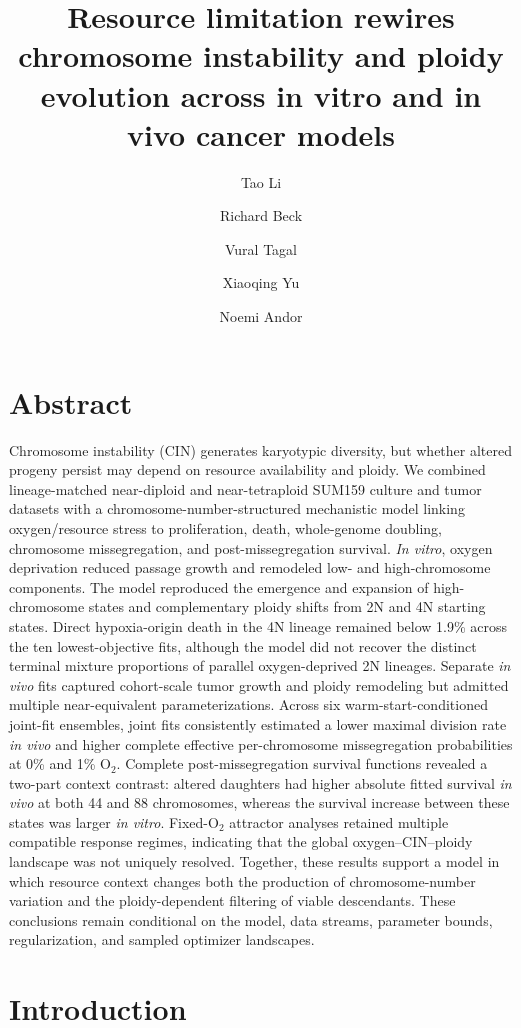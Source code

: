 \documentclass[11pt]{article}
\title{Resource limitation rewires chromosome instability and ploidy evolution across in vitro and in vivo cancer models}
\author[1,$\dagger$]{Tao Li}
\author[1,$\dagger$]{Richard Beck}
\author[1]{Vural Tagal}
\author[2]{Xiaoqing Yu}
\author[1,*]{Noemi Andor}
\affil[1]{H. Lee Moffitt Cancer Center \& Research Institute, Tampa, FL, USA}
\affil[2]{ \footnotesize Department of Biostatistics and Bioinformatics, H Lee Moffitt Cancer Center and Research Institute, Tampa, FL, USA}
\affil[$\dagger$]{These authors contributed equally to this work.}
\date{}
\begin{document}
\maketitle

\section*{Abstract}

Chromosome instability (CIN) generates karyotypic diversity, but whether altered progeny persist may depend on resource availability and ploidy. We combined lineage-matched near-diploid and near-tetraploid SUM159 culture and tumor datasets with a chromosome-number-structured mechanistic model linking oxygen/resource stress to proliferation, death, whole-genome doubling, chromosome missegregation, and post-missegregation survival. \textit{In vitro}, oxygen deprivation reduced passage growth and remodeled low- and high-chromosome components. The model reproduced the emergence and expansion of high-chromosome states and complementary ploidy shifts from 2N and 4N starting states. Direct hypoxia-origin death in the 4N lineage remained below 1.9\% across the ten lowest-objective fits, although the model did not recover the distinct terminal mixture proportions of parallel oxygen-deprived 2N lineages. Separate \textit{in vivo} fits captured cohort-scale tumor growth and ploidy remodeling but admitted multiple near-equivalent parameterizations. Across six warm-start-conditioned joint-fit ensembles, joint fits consistently estimated a lower maximal division rate \textit{in vivo} and higher complete effective per-chromosome missegregation probabilities at 0\% and 1\% O$_2$. Complete post-missegregation survival functions revealed a two-part context contrast: altered daughters had higher absolute fitted survival \textit{in vivo} at both 44 and 88 chromosomes, whereas the survival increase between these states was larger \textit{in vitro}. Fixed-O$_2$ attractor analyses retained multiple compatible response regimes, indicating that the global oxygen--CIN--ploidy landscape was not uniquely resolved. Together, these results support a model in which resource context changes both the production of chromosome-number variation and the ploidy-dependent filtering of viable descendants. These conclusions remain conditional on the model, data streams, parameter bounds, regularization, and sampled optimizer landscapes.

\section*{Introduction}
\end{document}
